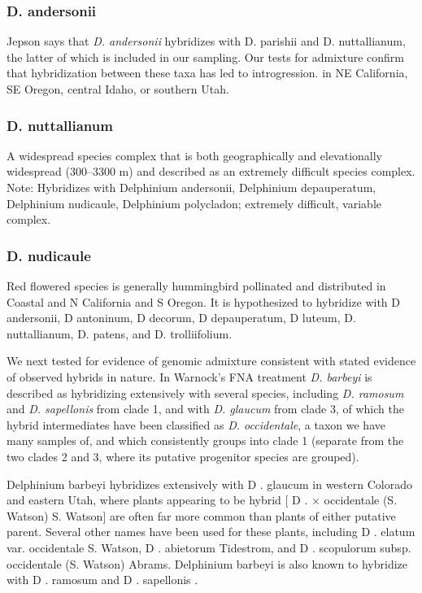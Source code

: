 \documentclass[11pt]{article}
\begin{document}
\subsubsection{D. andersonii}
Jepson says that \emph{D. andersonii} hybridizes with D. parishii and D. nuttallianum,
the latter of which is included in our sampling. Our tests for admixture confirm
that hybridization between these taxa has led to introgression.
in NE California, SE Oregon, central Idaho, or southern Utah. 


\subsubsection{D. nuttallianum}
A widespread species complex that is both geographically and elevationally widespread (300--3300 m) and 
described as an extremely difficult species complex. 
Note: Hybridizes with Delphinium andersonii, Delphinium depauperatum, Delphinium nudicaule, Delphinium polycladon; extremely difficult, variable complex.


\subsubsection{D. nudicaule}
Red flowered species is generally hummingbird pollinated and distributed in Coastal and N California and S Oregon. It is hypothesized to hybridize with D andersonii, D antoninum, D decorum, D depauperatum, D luteum, D. nuttallianum, D. patens, and D. trolliifolium. 



We next tested for evidence of genomic admixture consistent with stated evidence
of observed hybrids in nature. In Warnock's FNA treatment \emph{D. barbeyi} is 
described as hybridizing extensively with several species, including 
\emph{D. ramosum} and \emph{D. sapellonis} from clade 1, and with 
\emph{D. glaucum} from clade 3, of which the hybrid intermediates have been 
classified as \emph{D. occidentale}, a taxon we have many samples of, and
which consistently groups into clade 1 (separate from the two clades 2 and 3, 
where its putative progenitor species are grouped). 



Delphinium barbeyi hybridizes extensively with D . glaucum in western Colorado and eastern Utah, where plants appearing to be hybrid [ D . × occidentale (S. Watson) S. Watson] are often far more common than plants of either putative parent. Several other names have been used for these plants, including D . elatum var. occidentale S. Watson, D . abietorum Tidestrom, and D . scopulorum subsp. occidentale (S. Watson) Abrams. Delphinium barbeyi is also known to hybridize with D . ramosum and D . sapellonis .
\end{document}

